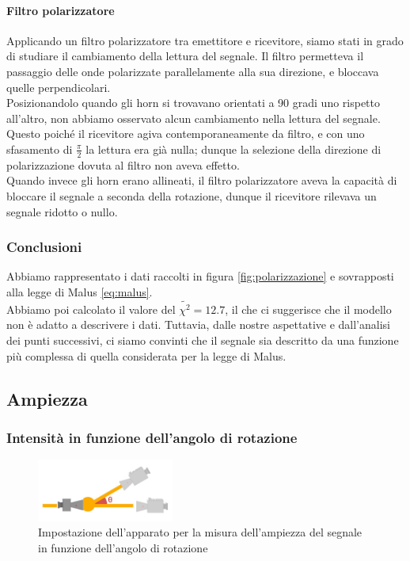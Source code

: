 \documentclass[letterpaper,12pt]{article}
\begin{document}
\paragraph*{Filtro polarizzatore}
Applicando un filtro polarizzatore tra emettitore e ricevitore, siamo stati in grado di studiare il cambiamento della lettura del segnale.
Il filtro permetteva il passaggio delle onde polarizzate parallelamente alla sua direzione, e bloccava quelle perpendicolari.\\
Posizionandolo quando gli horn si trovavano orientati a 90 gradi uno rispetto all'altro, non abbiamo osservato alcun cambiamento nella lettura del segnale. 
Questo poiché il ricevitore agiva contemporaneamente da filtro, e con uno sfasamento di $\frac{\pi}{2}$ la lettura era già nulla; dunque la
selezione della direzione di polarizzazione dovuta al filtro non aveva effetto.\\
Quando invece gli horn erano allineati, il filtro polarizzatore aveva la capacità di bloccare il segnale a seconda della rotazione, dunque il ricevitore
rilevava un segnale ridotto o nullo.

\subsubsection{Conclusioni}

Abbiamo rappresentato i dati raccolti in figura \ref{fig:polarizzazione} e sovrapposti alla legge di Malus \eqref{eq:malus}.\\ 
Abbiamo poi calcolato il valore del $\tilde{\chi^2} = 12.7$, il che ci suggerisce che il modello non è adatto a descrivere i dati.
Tuttavia, dalle nostre aspettative e dall'analisi dei punti successivi, ci siamo convinti che il segnale sia descritto da una funzione più complessa di quella
considerata per la legge di Malus.\\ 


\subsection{Ampiezza}
\subsubsection{Intensità in funzione dell'angolo di rotazione}

\begin{figure}[h!]
    \centering
    \includegraphics[width = 0.4\textwidth]{ampiezza rotazione.jpg}
    \caption{Impostazione dell'apparato per la misura dell'ampiezza del segnale in funzione dell'angolo di rotazione}
    \label{fig:ampiezza_angolo}
\end{figure}
\end{document}
